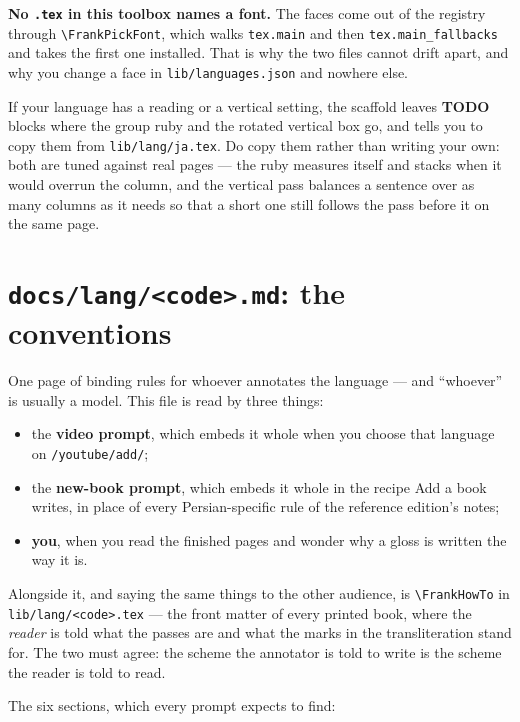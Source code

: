 \documentclass[11pt,oneside]{report}
\newcommand{\file}[1]{\texttt{#1}}
\newcommand{\menu}[1]{\textsf{#1}}
\begin{document}
\begin{warnbox}
\textbf{No \file{.tex} in this toolbox names a font.} The faces come out of the
registry through \texttt{\textbackslash FrankPickFont}, which walks
\texttt{tex.main} and then \texttt{tex.main\_fallbacks} and takes the first one
installed. That is why the two files cannot drift apart, and why you change a
face in \file{lib/languages.json} and nowhere else.
\end{warnbox}

If your language has a reading or a vertical setting, the scaffold leaves
\textbf{TODO} blocks where the group ruby and the rotated vertical box go, and
tells you to copy them from \file{lib/lang/ja.tex}. Do copy them rather than
writing your own: both are tuned against real pages --- the ruby measures
itself and stacks when it would overrun the column, and the vertical pass
balances a sentence over as many columns as it needs so that a short one still
follows the pass before it on the same page.

\section{\file{docs/lang/<code>.md}: the conventions}

One page of binding rules for whoever annotates the language --- and
``whoever'' is usually a model. This file is read by three things:

\begin{itemize}
\item the \textbf{video prompt}, which embeds it whole when you choose that
  language on \texttt{/youtube/add/};
\item the \textbf{new-book prompt}, which embeds it whole in the recipe
  \menu{Add a book} writes, in place of every Persian-specific rule of the
  reference edition's notes;
\item \textbf{you}, when you read the finished pages and wonder why a gloss
  is written the way it is.
\end{itemize}

Alongside it, and saying the same things to the other audience, is
\texttt{\textbackslash FrankHowTo} in \file{lib/lang/<code>.tex} --- the front
matter of every printed book, where the \emph{reader} is told what the passes
are and what the marks in the transliteration stand for. The two must agree:
the scheme the annotator is told to write is the scheme the reader is told to
read.

The six sections, which every prompt expects to find:
\end{document}
